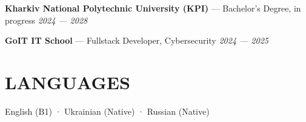 \documentclass[10pt,a4paper]{article}
\begin{document}
{\bfseries Kharkiv National Polytechnic University (KPI)} — Bachelor's Degree, in progress \hfill {\itshape 2024 — 2028}\par
{\bfseries GoIT IT School} — Fullstack Developer, Cybersecurity \hfill {\itshape 2024 — 2025}

\section*{LANGUAGES}

English (B1) · Ukrainian (Native) · Russian (Native)
\end{document}
